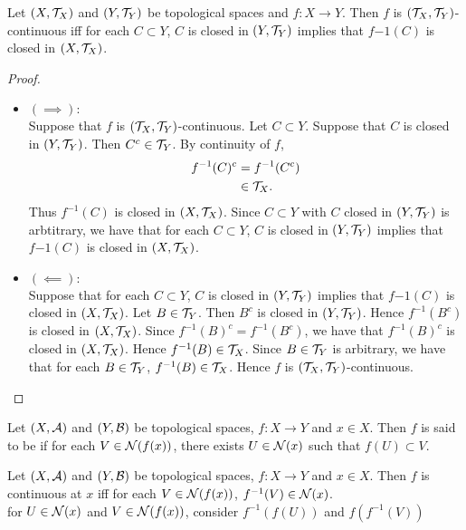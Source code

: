 \documentclass{book}
\begin{document}
	\begin{ex} 
		Let $(X,\mathcal{T}_X)$ and $(Y,\mathcal{T}_Y)$ be topological spaces and $f:X \rightarrow Y$. Then $f$ is $(\mathcal{T}_X, \mathcal{T}_Y)$-continuous iff for each $C \subset Y$, $C$ is closed in $(Y, \mathcal{T}_Y)$ implies that $f{-1}(C)$ is closed in $(X, \mathcal{T}_X)$. 
	\end{ex}

	\begin{proof}
		\begin{itemize}
			\item $(\implies):$ \\
			Suppose that $f$ is $(\mathcal{T}_X, \mathcal{T}_Y)$-continuous. Let $C \subset Y$. Suppose that $C$ is closed in $(Y, \mathcal{T}_Y)$. Then $C^c \in \mathcal{T}_Y$. By continuity of $f$,
			\begin{align*}
				f^{-1}(C)^c
				& = f^{-1}(C^c) \\
				& \in \mathcal{T}_X.
			\end{align*} 
			Thus $f^{-1}(C)$ is closed in $(X, \mathcal{T}_X)$. Since $C \subset Y$ with $C$ closed in $(Y, \mathcal{T}_Y)$ is arbtitrary, we have that for each $C \subset Y$, $C$ is closed in $(Y, \mathcal{T}_Y)$ implies that $f{-1}(C)$ is closed in $(X, \mathcal{T}_X)$. 
			\item $(\impliedby):$ \\
			Suppose that for each $C \subset Y$, $C$ is closed in $(Y, \mathcal{T}_Y)$ implies that $f{-1}(C)$ is closed in $(X, \mathcal{T}_X)$. Let $B \in \mathcal{T}_Y$. Then $B^c$ is closed in $(Y, \mathcal{T}_Y)$. Hence $f^{-1}(B^c)$ is closed in $(X, \mathcal{T}_X)$. Since $f^{-1}(B)^c = f^{-1}(B^c)$, we have that $f^{-1}(B)^c$ is closed in $(X, \mathcal{T}_X)$. Hence $f^{-1}(B) \in \mathcal{T}_X$. Since $B \in \mathcal{T}_Y$ is arbitrary, we have that for each $B \in \mathcal{T}_Y$, $f^{-1}(B) \in \mathcal{T}_X$. Hence $f$ is $(\mathcal{T}_X, \mathcal{T}_Y)$-continuous.
		\end{itemize}
	\end{proof}
	
	\begin{defn} 
	Let $(X,\mathcal{A})$ and $(Y,\mathcal{B})$ be topological spaces, $f:X \rightarrow Y$ and $x \in X$. Then $f$ is said to be  if for each $V \in \mathcal{N}(f(x))$, there exists $U \in \mathcal{N}(x)$ such that $f(U) \subset V$. 
	\end{defn}		
	
	\begin{ex} 
	Let $(X,\mathcal{A})$ and $(Y,\mathcal{B})$ be topological spaces, $f:X \rightarrow Y$ and $x \in X$. Then $f$ is continuous at $x$ iff for each $V \in \mathcal{N}(f(x))$, $f^{-1}(V) \in \mathcal{N}(x)$.\\
	 for $U \in \mathcal{N}(x)$ and $V \in \mathcal{N}(f(x))$, consider $f^{-1}(f(U))$ and $f(f^{-1}(V))$
	\end{ex}
	
\end{document}
